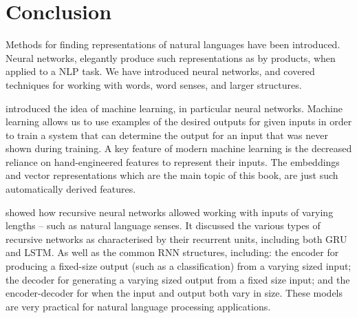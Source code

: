 \documentclass[12pt,parskip]{komatufte}
\begin{document}

\chapter{Conclusion}\label{sec:conclusion}

Methods for finding representations of natural languages have been introduced.
Neural networks, elegantly produce such representations as by products, when applied to a NLP task.
We have introduced neural networks, and covered techniques for working with words, word senses, and larger structures.





 introduced the idea of machine learning, in particular neural networks.
Machine learning allows us to use examples of the desired outputs for given inputs
in order to train a system that can determine the output for an input that was never shown during training.
A key feature of modern machine learning is the decreased reliance on hand-engineered features to represent their inputs.
The embeddings and vector representations which are the main topic of this book, are just such automatically derived features.


 showed how recursive neural networks allowed working with inputs of varying lengths -- such as natural language senses.
It discussed the various types of recursive networks as characterised by their recurrent units, including both GRU and LSTM.
As well as the common RNN structures, including:
the encoder for producing a fixed-size  output (such as a classification) from a varying sized input;
the decoder for generating a varying sized output from a fixed size input;
and the encoder-decoder for when the input and output both vary in size.
These models are very practical for natural language processing applications.
\end{document}
